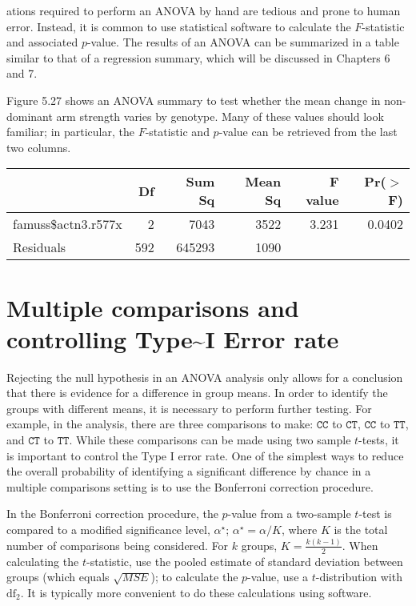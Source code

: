 \documentclass[
  letterpaper,
  DIV=11,
  numbers=noendperiod]{scrreprt}
\begin{document}
ations required to perform an ANOVA by hand are tedious and prone to
human error. Instead, it is common to use statistical software to
calculate the \(F\)-statistic and associated \(p\)-value. The results of
an ANOVA can be summarized in a table similar to that of a regression
summary, which will be discussed in Chapters 6 and 7.

Figure 5.27 shows an ANOVA summary to test whether the mean change in
non-dominant arm strength varies by genotype. Many of these values
should look familiar; in particular, the \(F\)-statistic and \(p\)-value
can be retrieved from the last two columns.

\begin{tabular}{lrrrrr}
\hline
& Df & Sum Sq & Mean Sq & F value & Pr($>$F) \\ 
\hline
famuss\$actn3.r577x & 2 & 7043 & 3522 & 3.231 & 0.0402 \\ 
Residuals & 592 & 645293 & 1090 &  &  \\    \hline
\end{tabular}

\hypertarget{multiple-comparisons-and-controlling-typei-error-rate}{%
\section{Multiple comparisons and controlling Type\textasciitilde I
Error
rate}\label{multiple-comparisons-and-controlling-typei-error-rate}}

Rejecting the null hypothesis in an ANOVA analysis only allows for a
conclusion that there is evidence for a difference in group means. In
order to identify the groups with different means, it is necessary to
perform further testing. For example, in the  analysis,
there are three comparisons to make: \(\texttt{CC}\) to \(\texttt{CT}\),
\(\texttt{CC}\) to \(\texttt{TT}\), and \(\texttt{CT}\) to
\(\texttt{TT}\). While these comparisons can be made using two sample
\(t\)-tests, it is important to control the Type I error rate. One of
the simplest ways to reduce the overall probability of identifying a
significant difference by chance in a multiple comparisons setting is to
use the Bonferroni correction procedure.

In the Bonferroni correction procedure, the \(p\)-value from a
two-sample \(t\)-test is compared to a modified significance level,
\(\alpha^\star\); \(\alpha^\star = \alpha/K\), where \(K\) is the total
number of comparisons being considered. For \(k\) groups,
\(K=\frac{k(k-1)}{2}\). When calculating the \(t\)-statistic, use the
pooled estimate of standard deviation between groups (which equals
\(\sqrt{MSE}\)); to calculate the \(p\)-value, use a \(t\)-distribution
with \(\textrm{df}_2\). It is typically more convenient to do these
calculations using software.
\end{document}
